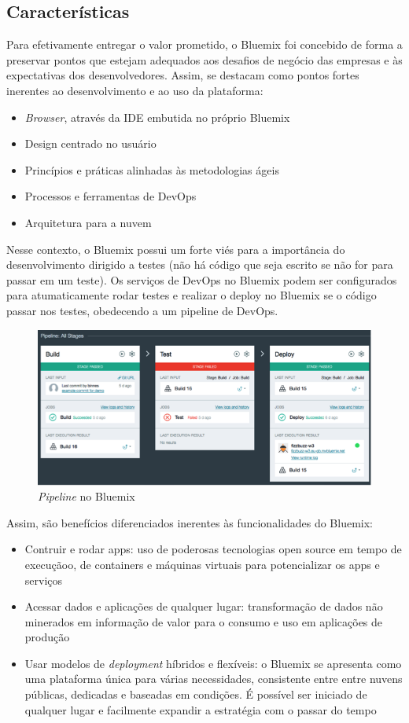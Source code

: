 \subsection{Características}

Para efetivamente entregar o valor prometido, o Bluemix foi concebido de forma a preservar pontos que estejam adequados aos desafios de negócio das empresas e às expectativas dos desenvolvedores. Assim, se destacam como pontos fortes inerentes ao desenvolvimento e ao uso da plataforma:
\begin{itemize}
    \item \textit{Browser}, através da IDE embutida no próprio Bluemix
    \item  Design centrado no usuário
    \item  Princípios e práticas alinhadas às metodologias ágeis
    \item  Processos e ferramentas de DevOps
    \item  Arquitetura para a nuvem
\end{itemize}

Nesse contexto, o Bluemix possui um forte viés para a importância do desenvolvimento dirigido a testes (não há código que seja escrito se não for para passar em um teste). Os serviços de DevOps no Bluemix podem ser configurados para atumaticamente rodar testes e realizar o deploy no Bluemix se o código passar nos testes, obedecendo a um pipeline de DevOps.
\begin{figure}[!htb]
    \centering
    \includegraphics{imagens/pipeline}
    \caption{\textit{Pipeline} no Bluemix}
    \label{Rotulo}
\end{figure}

Assim, são benefícios diferenciados inerentes às funcionalidades do Bluemix:
\begin{itemize}
    \item	Contruir e rodar apps: uso de poderosas tecnologias open source em tempo de execuçãoo, de containers e máquinas virtuais para potencializar os apps e serviços
    \item	Acessar dados e aplicações de qualquer lugar: transformação de dados não minerados em informação de valor para o consumo e uso em aplicações de produção
    \item	Usar modelos de \textit{deployment} híbridos e flexíveis: o Bluemix se apresenta como uma plataforma única para várias necessidades, consistente entre entre nuvens públicas, dedicadas e baseadas em condições. É possível ser iniciado de qualquer lugar e facilmente expandir a estratégia com o passar do tempo
\end{itemize}

